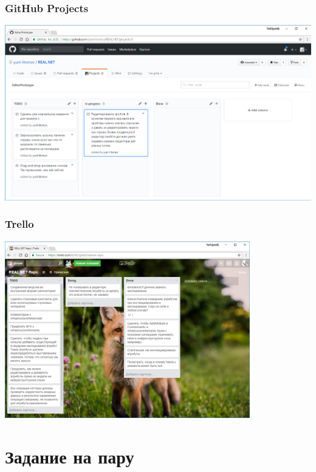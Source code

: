 \documentclass[xetex,mathserif,serif]{beamer}
\begin{document}
	\begin{frame}
		\frametitle{GitHub Projects}
		\begin{center}
			\includegraphics[width=\textwidth]{githubProjects.png}
		\end{center}
	\end{frame}

	\begin{frame}
		\frametitle{Trello}
		\begin{center}
			\includegraphics[width=0.8\textwidth]{trello.png}
		\end{center}
	\end{frame}

	\section{Задание на пару}
\end{document}
